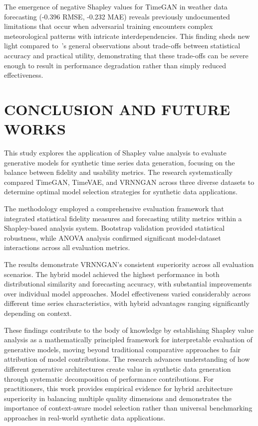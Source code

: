 \documentclass{article}
\begin{document}
The emergence of negative Shapley values for TimeGAN in weather data forecasting (-0.396 RMSE, -0.232 MAE) reveals previously undocumented limitations that occur when adversarial training encounters complex meteorological patterns with intricate interdependencies. This finding sheds new light compared to~\cite{lu_machine_2024}'s general observations about trade-offs between statistical accuracy and practical utility, demonstrating that these trade-offs can be severe enough to result in performance degradation rather than simply reduced effectiveness.


\newpage
\section{CONCLUSION AND FUTURE WORKS}
This study explores the application of Shapley value analysis to evaluate generative models for synthetic time series data generation, focusing on the balance between fidelity and usability metrics. The research systematically compared TimeGAN, TimeVAE, and VRNNGAN across three diverse datasets to determine optimal model selection strategies for synthetic data applications. 

The methodology employed a comprehensive evaluation framework that integrated statistical fidelity measures and forecasting utility metrics within a Shapley-based analysis system. Bootstrap validation provided statistical robustness, while ANOVA analysis confirmed significant model-dataset interactions across all evaluation metrics.

The results demonstrate VRNNGAN's consistent superiority across all evaluation scenarios. The hybrid model achieved the highest performance in both distributional similarity and forecasting accuracy, with substantial improvements over individual model approaches. Model effectiveness varied considerably across different time series characteristics, with hybrid advantages ranging significantly depending on context. 

These findings contribute to the body of knowledge by establishing Shapley value analysis as a mathematically principled framework for interpretable evaluation of generative models, moving beyond traditional comparative approaches to fair attribution of model contributions. The research advances understanding of how different generative architectures create value in synthetic data generation through systematic decomposition of performance contributions. For practitioners, this work provides empirical evidence for hybrid architecture superiority in balancing multiple quality dimensions and demonstrates the importance of context-aware model selection rather than universal benchmarking approaches in real-world synthetic data applications.
\end{document}
